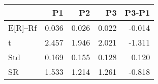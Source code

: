 \begin{tabular}{lrrrr}
\toprule
 & P1 & P2 & P3 & P3-P1 \\
\midrule
E[R]--Rf & 0.036 & 0.026 & 0.022 & -0.014 \\
t & 2.457 & 1.946 & 2.021 & -1.311 \\
Std & 0.169 & 0.155 & 0.128 & 0.120 \\
SR & 1.533 & 1.214 & 1.261 & -0.818 \\
\bottomrule
\end{tabular}
